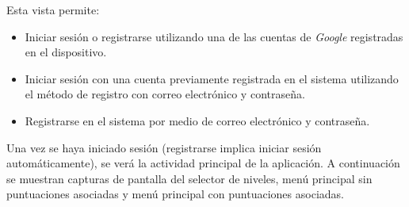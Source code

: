 \documentclass[twoside]{report}
\begin{document}
Esta vista permite:
\begin{itemize}
\item Iniciar sesión o registrarse utilizando una de las cuentas de \textit{Google} registradas en el dispositivo.
\item Iniciar sesión con una cuenta previamente registrada en el sistema utilizando el método de registro con correo electrónico y contraseña.
\item Registrarse en el sistema por medio de correo electrónico y contraseña.
\end{itemize}

Una vez se haya iniciado sesión (registrarse implica iniciar sesión automáticamente), se verá la actividad principal de la aplicación. A continuación se muestran capturas de pantalla del selector de niveles, menú principal sin puntuaciones asociadas y menú principal con puntuaciones asociadas.
\end{document}
